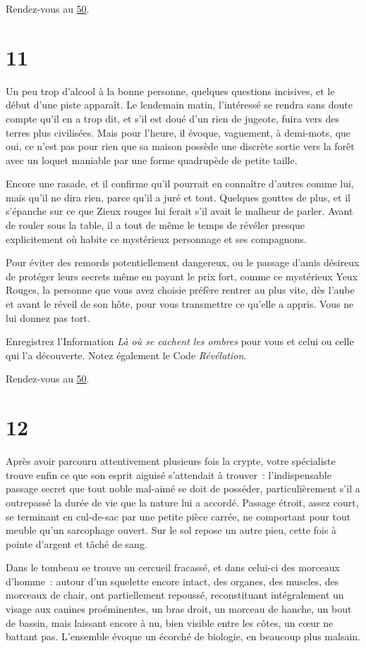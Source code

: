 \documentclass{report}
\newcommand{\gsection}[1]{
    \section{#1}
    \label{section-#1}
}
\newcommand{\glink}[1]{\hyperref[section-#1]{#1}}
\begin{document}
Rendez-vous au \glink{50}.

\gsection{11}

Un peu trop d'alcool à la bonne personne, quelques questions incisives, et le début d'une piste apparaît. Le lendemain matin, l'intéressé se rendra sans doute compte qu'il en a trop dit, et s'il est doué d'un rien de jugeote, fuira vers des terres plus civilisées. Mais pour l'heure, il évoque, vaguement, à demi-mots, que oui, ce n'est pas pour rien que sa maison possède une discrète sortie vers la forêt avec un loquet maniable par une forme quadrupède de petite taille.

Encore une rasade, et il confirme qu'il pourrait en connaître d'autres comme lui, mais qu'il ne dira rien, parce qu'il a juré et tout. Quelques gouttes de plus, et il s'épanche sur ce que Zieux rouges lui ferait s'il avait le malheur de parler. Avant de rouler sous la table, il a tout de même le temps de révéler presque explicitement où habite ce mystérieux personnage et ses compagnons.

Pour éviter des remords potentiellement dangereux, ou le passage d'amis désireux de protéger leurs secrets même en payant le prix fort, comme ce mystérieux Yeux Rouges, la personne que vous avez choisie préfère rentrer au plus vite, dès l'aube et avant le réveil de son hôte, pour vous transmettre ce qu'elle a appris. Vous ne lui donnez pas tort.

Enregistrez l'Information \emph{Là où se cachent les ombres} pour vous et celui ou celle qui l'a découverte. Notez également le Code \emph{Révélation}.

Rendez-vous au \glink{50}.

\gsection{12}

Après avoir parcouru attentivement plusieurs fois la crypte, votre spécialiste trouve enfin ce que son esprit aiguisé s'attendait à trouver : l'indispensable passage secret que tout noble mal-aimé se doit de posséder, particulièrement s'il a outrepassé la durée de vie que la nature lui a accordé. Passage étroit, assez court, se terminant en cul-de-sac par une petite pièce carrée, ne comportant pour tout meuble qu'un sarcophage ouvert. Sur le sol repose un autre pieu, cette fois à pointe d'argent et tâché de sang.

Dans le tombeau se trouve un cercueil fracassé, et dans celui-ci des morceaux d'homme : autour d'un squelette encore intact, des organes, des muscles, des morceaux de chair, ont partiellement repoussé, reconstituant intégralement un visage aux canines proéminentes, un bras droit, un morceau de hanche, un bout de bassin, mais laissant encore à nu, bien visible entre les côtes, un cœur ne battant pas. L'ensemble évoque un écorché de biologie, en beaucoup plus malsain.
\end{document}
